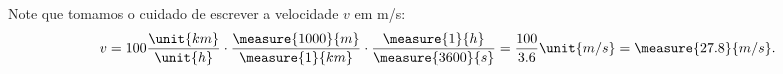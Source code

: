 \begin{question}
\begin{solution}
		Note que tomamos o cuidado de escrever a velocidade $v$ em \unit{m/s}:
		\begin{equation*}
			v = 100 \frac{\unit{km}}{\unit{h}} \cdot \frac{\measure{1000}{m}}{\measure{1}{km}} \cdot \frac{\measure{1}{h}}{\measure{3600}{s}} = \frac{100}{3.6} \unit{m/s} = \measure{27.8}{m/s}.
		\end{equation*}
	\end{solution}
\end{question}

\begin{comment}
	```python
	def exercicio_7(r, v, m, g = 9.81):
		return(m*(g-(v/3.6)**2/r))
	```
\end{comment}